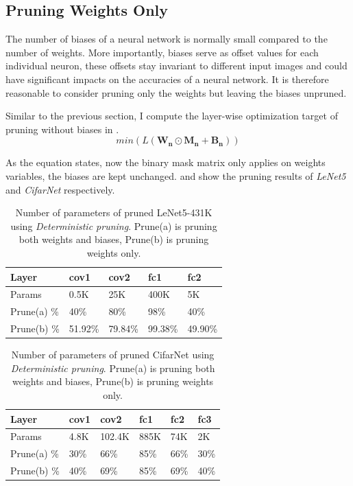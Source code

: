 \documentclass[a4paper,12pt]{report}
\begin{document}
\subsection{Pruning Weights Only}
The number of biases of a neural network is normally small compared to
the number of weights.
More importantly, biases serve as offset values for each individual neuron,
these offsets stay invariant to different input images and could have significant
impacts on the accuracies of a neural network.
It is therefore reasonable to consider pruning only the
weights but leaving the biases unpruned.

Similar to the previous section, I compute the layer-wise optimization target
of pruning without biases in .
\begin{equation}
  min(L(\mathbf{W_n} \odot \mathbf{M_n} + \mathbf{B_n}))
  \label{equ:lossmin2}
\end{equation}

As the equation states, now the binary mask matrix only applies on weights variables,
the biases are kept unchanged.
 and  show the pruning results
of \textit{LeNet5} and \textit{CifarNet} respectively.

\begin{table}[!h]
\centering
\begin{tabular}{|l|l|l|l|l|}
\hline
Layer			&cov1	&cov2	&fc1	&fc2 		\\ \hline
Params		& 0.5K		&25K	&400K	&5K		\\
\hline
Prune(a) \%	& 40\%		&80\%	&98\%	&40\%	\\
\hline
Prune(b) \%	& 51.92\%		&79.84\%	&99.38\%	&49.90\%	 \\
\hline
\end{tabular}
\caption{Number of parameters of pruned LeNet5-431K using \textit{Deterministic
pruning}. Prune(a) is pruning both weights and biases, Prune(b) is pruning weights only.}
\label{tab:LeNetPrune2}
\end{table}

\begin{table}[!h]
\centering
\begin{tabular}{|l|l|l|l|l|l|}
\hline
Layer			&cov1	&cov2		&fc1		&fc2		&fc3		\\ \hline
Params		& 4.8K		&102.4K	&885K	&74K		&2K 	\\
\hline
Prune(a) \%	& 30\%		&66\%	&85\%	&66\%	&30\%	 \\
\hline
Prune(b) \%	& 40\%		&69\%	&85\%	&69\%	&40\% \\
\hline
\end{tabular}
\caption{Number of parameters of pruned CifarNet using \textit{Deterministic
pruning}. Prune(a) is pruning both weights and biases, Prune(b) is pruning weights only.}
\label{tab:CifarNetPrune2}
\end{table}
\end{document}
